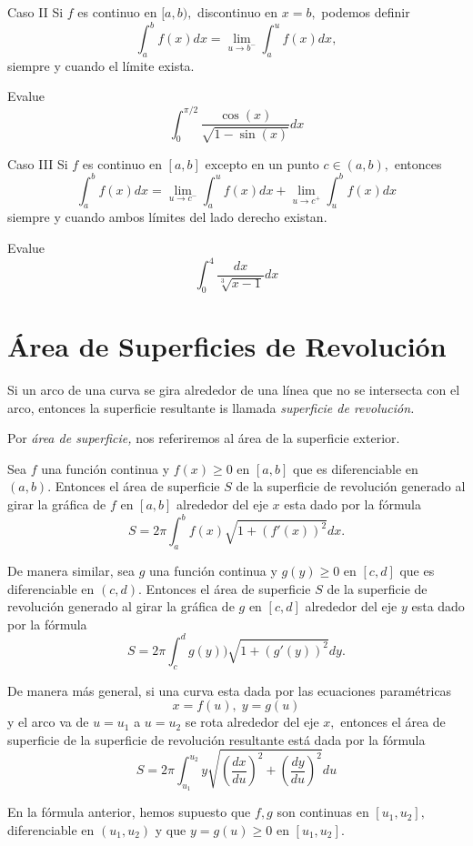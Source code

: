{Caso II}
Si $f$ es continuo en $[a,b),$ discontinuo en $x=b,$ podemos definir
$$
\displaystyle \int_{a}^{b}f(x)dx=\lim_{u\to b^{-}} \int_{a}^{u}f(x)dx,
$$ siempre y cuando el l\'imite exista.


\begin{problema}
 Evalue
 $$\displaystyle \int_{0}^{\pi/2}\dfrac{\cos(x)}{\sqrt{1-\sin(x)}} dx$$
\end{problema}



{Caso III}
Si $f$ es continuo en $[a,b]$ excepto en un punto $c\in(a,b),$ entonces
$$
\int_{a}^{b}f(x)dx = 
\lim_{u \to c^{-}} \int_{a}^{u}f(x)dx+
\lim_{u \to c^{+}} \int_{u}^{b}f(x)dx
$$
siempre y cuando ambos l\'imites del lado derecho existan.


\begin{problema}
 Evalue 
$$\displaystyle \int_{0}^{4}\dfrac{dx}{\sqrt[3]{x-1}} dx$$
\end{problema}


\section{Área de Superficies de Revoluci\'on}


Si un arco de una curva se gira alrededor de una l\'inea que no se intersecta con el arco, entonces la superficie resultante is llamada \emph{superficie de revoluci\'on.} 

Por \emph{área de superficie,} nos referiremos al área de la superficie exterior.




Sea $f$ una funci\'on continua y $f(x)\geq 0$  en $[a,b]$ que es diferenciable en $(a,b).$  Entonces el área de superficie $S$ de la superficie de revoluci\'on  generado al girar la gráfica de $f$ en $[a,b]$ alrededor del eje $x$ esta dado por la f\'ormula
\[
 \label{36.1}
 S=2\pi \int_{a}^{b}f(x)\sqrt{1+(f'(x))^{2}}dx.
\]





De manera similar, sea $g$ una funci\'on continua y $g(y) \geq 0$  en $[c,d]$ que es diferenciable en $(c,d).$  Entonces el área de superficie $S$ de la superficie de revoluci\'on  generado al girar la gráfica de $g$ en $[c,d]$ alrededor del eje $y$ esta dado por la f\'ormula
\[
 \label{36.2}
 S=2\pi \int_{c}^{d}g(y))\sqrt{1+(g'(y))^{2}}dy.
\]




De manera más general, si una curva esta dada por las ecuaciones param\'etricas
$$
x=f(u), \; y=g(u)
$$ y el arco va de $u=u_{1}$ a $u=u_{2}$ se rota alrededor del eje $x,$ entonces el área de superficie de la superficie de revoluci\'on resultante está dada por la f\'ormula
\[
 \label{36.3}
 S=2\pi\int_{u_{1}}^{u_{2}}y\sqrt{\left( \dfrac{dx}{du} \right)^{2}+\left( \dfrac{dy}{du} \right)^{2}}du
\]
 

En la f\'ormula anterior, hemos supuesto que $f,g$ son continuas en $[u_{1},u_{2}],$ diferenciable en $\left( u_{1},u_{2} \right)$ y que $y=g(u)\geq 0$ en $[u_{1},u_{2}].$
